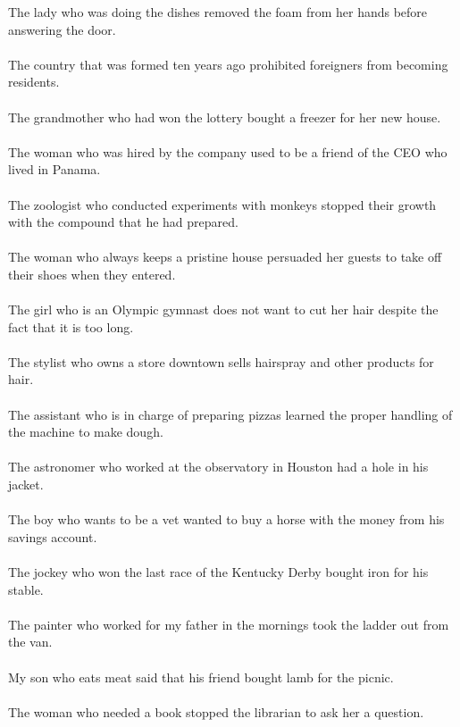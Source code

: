 The lady who was doing the dishes removed the foam from her hands before answering the door.	\\	\\
The country that was formed ten years ago prohibited foreigners from becoming residents.	\\	\\
The grandmother who had won the lottery bought a freezer for her new house.	\\	\\
The woman who was hired by the company used to be a friend of the CEO who lived in Panama.	\\	\\
The zoologist who conducted experiments with monkeys stopped their growth with the compound that he had prepared.	\\	\\
The woman who always keeps a pristine house persuaded her guests to take off their shoes when they entered.	\\	\\
The girl who is an Olympic gymnast does not want to cut her hair despite the fact that it is too long.	\\	\\
The stylist who owns a store downtown sells hairspray and other products for hair.	\\	\\
The assistant who is in charge of preparing pizzas learned the proper handling of the machine to make dough.	\\	\\
The astronomer who worked at the observatory in Houston had a hole in his jacket.	\\	\\
The boy who wants to be a vet wanted to buy a horse with the money from his savings account.	\\	\\
The jockey who won the last race of the Kentucky Derby bought iron for his stable.	\\	\\
The painter who worked for my father in the mornings took the ladder out from the van.	\\	\\
My son who eats meat said that his friend bought lamb for the picnic.	\\	\\
The woman who needed a book stopped the librarian to ask her a question.	\\	\\
